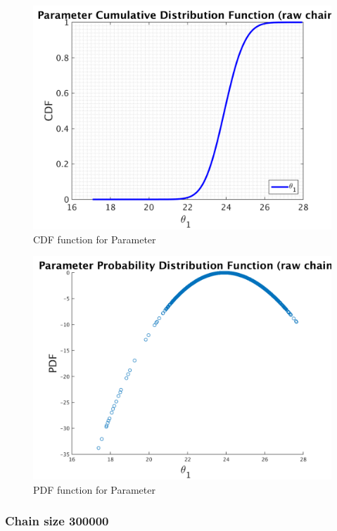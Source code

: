 \begin{figure}[H]
  
  \centering
   \includegraphics[scale=0.75]{100_results/outputData_100000/simple_ip_cdf_raw}
   \caption{CDF function for Parameter }
\end{figure}



\begin{figure}[H]
  
  \centering
   \includegraphics[scale=0.75]{100_results/outputData_100000/ip_logLike_unified}
   \caption{PDF function for Parameter }
\end{figure}


\subsubsection{Chain size 300000 }


